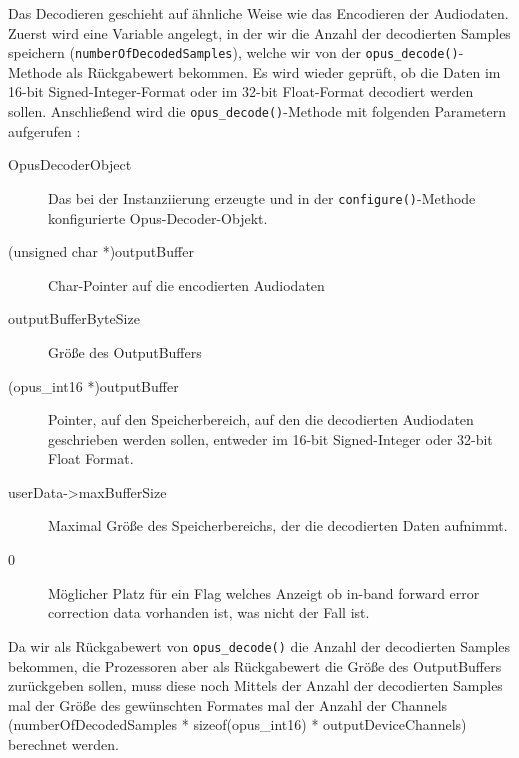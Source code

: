Das Decodieren geschieht auf ähnliche Weise wie das Encodieren der Audiodaten.
Zuerst wird eine Variable angelegt, in der wir die Anzahl der decodierten Samples speichern (\texttt{numberOfDecodedSamples}), welche wir von der \texttt{opus\_decode()}-Methode als Rückgabewert bekommen. Es wird wieder geprüft, ob die Daten im 16-bit Signed-Integer-Format oder im 32-bit Float-Format decodiert werden sollen. Anschließend wird die \texttt{opus\_decode()}-Methode mit folgenden Parametern aufgerufen :

\begin{description}
\item[OpusDecoderObject] Das bei der Instanziierung erzeugte und in der \texttt{configure()}-Methode konfigurierte Opus-Decoder-Objekt.
\item[(unsigned char *)outputBuffer] Char-Pointer auf die encodierten Audiodaten
\item[outputBufferByteSize] Größe des OutputBuffers
\item[(opus\_int16 *)outputBuffer] Pointer, auf den Speicherbereich, auf den die decodierten Audiodaten geschrieben werden sollen, entweder im 16-bit Signed-Integer oder 32-bit Float Format.
\item[userData->maxBufferSize] Maximal Größe des Speicherbereichs, der die decodierten Daten aufnimmt.
\item[0] Möglicher Platz für ein Flag welches Anzeigt ob in-band forward error correction data vorhanden ist, was nicht der Fall ist.
\end{description}

Da wir als Rückgabewert von \texttt{opus\_decode()} die Anzahl der decodierten Samples bekommen, die Prozessoren aber als Rückgabewert die Größe des OutputBuffers zurückgeben sollen, muss diese noch Mittels der Anzahl der decodierten Samples mal der Größe des gewünschten Formates mal der Anzahl der Channels (numberOfDecodedSamples * sizeof(opus\_int16) * outputDeviceChannels) berechnet werden.

